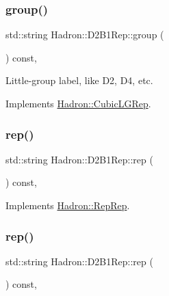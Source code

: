 \subsubsection{\texorpdfstring{group()}{group()}\hspace{0.1cm}{\footnotesize\ttfamily [3/3]}}
{\footnotesize\ttfamily std\+::string Hadron\+::\+D2\+B1\+Rep\+::group (\begin{DoxyParamCaption}{ }\end{DoxyParamCaption}) const\hspace{0.3cm}{\ttfamily [inline]}, {\ttfamily [virtual]}}

Little-\/group label, like D2, D4, etc. 

Implements \mbox{\hyperlink{structHadron_1_1CubicLGRep_a9bdb14b519a611d21379ed96a3a9eb41}{Hadron\+::\+Cubic\+L\+G\+Rep}}.

\mbox{\label{structHadron_1_1D2B1Rep_a7ff8b1fc65d3414195a7788bc220b1c0}} 
\subsubsection{\texorpdfstring{rep()}{rep()}\hspace{0.1cm}{\footnotesize\ttfamily [1/3]}}
{\footnotesize\ttfamily std\+::string Hadron\+::\+D2\+B1\+Rep\+::rep (\begin{DoxyParamCaption}{ }\end{DoxyParamCaption}) const\hspace{0.3cm}{\ttfamily [inline]}, {\ttfamily [virtual]}}



Implements \mbox{\hyperlink{structHadron_1_1RepRep_ab3213025f6de249f7095892109575fde}{Hadron\+::\+Rep\+Rep}}.

\mbox{\label{structHadron_1_1D2B1Rep_a7ff8b1fc65d3414195a7788bc220b1c0}} 
\subsubsection{\texorpdfstring{rep()}{rep()}\hspace{0.1cm}{\footnotesize\ttfamily [2/3]}}
{\footnotesize\ttfamily std\+::string Hadron\+::\+D2\+B1\+Rep\+::rep (\begin{DoxyParamCaption}{ }\end{DoxyParamCaption}) const\hspace{0.3cm}{\ttfamily [inline]}, {\ttfamily [virtual]}}



